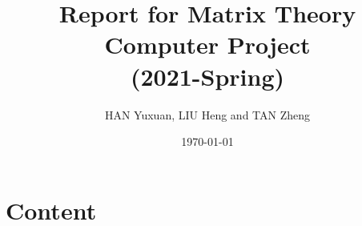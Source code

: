 \documentclass[
    aspectratio=169,                   %
]{beamer}
\begin{document}
    \title{Report for Matrix Theory Computer Project\\(2021-Spring)}  %
    \author{HAN Yuxuan, LIU Heng and TAN Zheng}                  %
    \date{\today}                          %
    \maketitle                             %

\part{Content}







\end{document}
